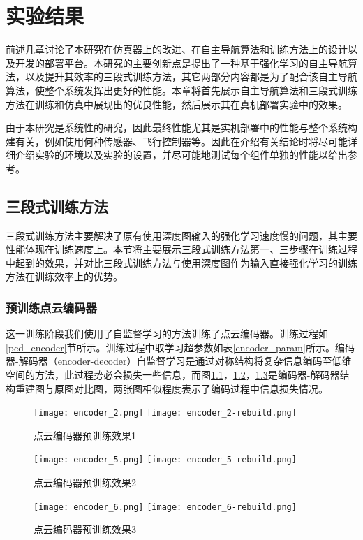 
\chapter{实验结果}
\label{result}

前述几章讨论了本研究在仿真器上的改进、在自主导航算法和训练方法上的设计以及开发的部署平台。本研究的主要创新点是提出了一种基于强化学习的自主导航算法，以及提升其效率的三段式训练方法，其它两部分内容都是为了配合该自主导航算法，使整个系统发挥出更好的性能。本章将首先展示自主导航算法和三段式训练方法在训练和仿真中展现出的优良性能，然后展示其在真机部署实验中的效果。

由于本研究是系统性的研究，因此最终性能尤其是实机部署中的性能与整个系统构建有关，例如使用何种传感器、飞行控制器等。因此在介绍有关结论时将尽可能详细介绍实验的环境以及实验的设置，并尽可能地测试每个组件单独的性能以给出参考。

\section{三段式训练方法}

三段式训练方法主要解决了原有使用深度图输入的强化学习速度慢的问题，其主要性能体现在训练速度上。本节将主要展示三段式训练方法第一、三步骤在训练过程中起到的效果，并对比三段式训练方法与使用深度图作为输入直接强化学习的训练方法在训练效率上的优势。

\subsection{预训练点云编码器}

这一训练阶段我们使用了自监督学习的方法训练了点云编码器。训练过程如\ref{pcd_encoder}节所示。训练过程中取学习超参数如表\ref{encoder_param}所示。编码器-解码器（encoder-decoder）自监督学习是通过对称结构将复杂信息编码至低维空间的方法，此过程势必会损失一些信息，而图\ref{fig_pcd_encoder_1}，\ref{fig_pcd_encoder_2}，\ref{fig_pcd_encoder_3}是编码器-解码器结构重建图与原图对比图，两张图相似程度表示了编码过程中信息损失情况。

\begin{figure}
  \centering
    {\texttt{[image: encoder\_2.png]}}
    {\texttt{[image: encoder\_2-rebuild.png]}}
  \caption{点云编码器预训练效果1}
  \label{fig_pcd_encoder_1}
\end{figure}
\begin{figure}
    \centering
      {\texttt{[image: encoder\_5.png]}}
      {\texttt{[image: encoder\_5-rebuild.png]}}
    \caption{点云编码器预训练效果2}
    \label{fig_pcd_encoder_2}
  \end{figure}
  \begin{figure}
    \centering
      {\texttt{[image: encoder\_6.png]}}
      {\texttt{[image: encoder\_6-rebuild.png]}}
    \caption{点云编码器预训练效果3}
    \label{fig_pcd_encoder_3}
  \end{figure}

